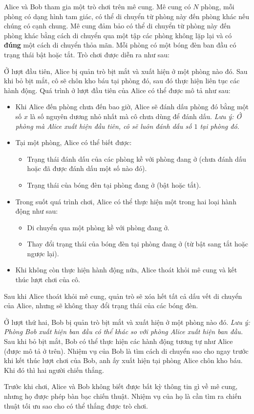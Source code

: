 Alice và Bob tham gia một trò chơi trên mê cung. Mê cung có $N$ phòng, mỗi phòng có dạng hình tam giác, có thể di chuyển từ phòng này đến phòng khác nếu chúng có cạnh chung. Mê cung đảm bảo có thể di chuyển từ phòng này đến phòng khác bằng cách di chuyển qua một tập các phòng không lặp lại và có \textbf{đúng} một cách di chuyển thỏa mãn. Mỗi phòng có một bóng đèn ban đầu có trạng thái bật hoặc tắt. Trò chơi được diễn ra như sau:

Ở lượt đầu tiên, Alice bị quản trò bịt mắt và xuất hiện ở một phòng nào đó. Sau khi bỏ bịt mắt, cô sẽ chôn kho báu tại phòng đó, sau đó thực hiện liên tục các hành động. Quá trình ở lượt đầu tiên của Alice có thể được mô tả như sau:
\begin{itemize}
   \item Khi Alice đến phòng chưa đến bao giờ, Alice sẽ đánh dấu phòng đó bằng một số $x$ là số nguyên dương nhỏ nhất mà cô chưa dùng để đánh dấu. \textit{Lưu ý: Ở phòng mà Alice xuất hiện đầu tiên, cô sẽ luôn đánh dấu số $1$ tại phòng đó}.
   \item Tại một phòng, Alice có thể biết được:
   \begin{itemize}
      \item Trạng thái đánh dấu của các phòng kề với phòng đang ở (chưa đánh dấu hoặc đã được đánh dấu một số nào đó).
      \item Trạng thái của bóng đèn tại phòng đang ở (bật hoặc tắt).
   \end{itemize}
   \item Trong suốt quá trình chơi, Alice có thể thực hiện một trong hai loại hành động như sau:
   \begin{itemize}
      \item Di chuyển qua một phòng kề với phòng đang ở.
      \item Thay đổi trạng thái của bóng đèn tại phòng đang ở (từ bật sang tắt hoặc ngược lại).
   \end{itemize}
   \item Khi không còn thực hiện hành động nữa, Alice thoát khỏi mê cung và kết thúc lượt chơi của cô.
\end{itemize}

Sau khi Alice thoát khỏi mê cung, quản trò sẽ xóa hết tất cả dấu vết di chuyển của Alice, nhưng sẽ không thay đổi trạng thái của các bóng đèn.

Ở lượt thứ hai, Bob bị quản trò bịt mắt và xuất hiện ở một phòng nào đó. \textit{Lưu ý: Phòng Bob xuất hiện ban đầu có thể khác so với phòng Alice xuất hiện ban đầu.} Sau khi bỏ bịt mắt, Bob có thể thực hiện các hành động tương tự như Alice (được mô tả ở trên). Nhiệm vụ của Bob là tìm cách di chuyển sao cho ngay trước khi kết thúc lượt chơi của Bob, anh ấy xuất hiện tại phòng Alice chôn kho báu. Khi đó thì hai người chiến thắng.

Trước khi chơi, Alice và Bob không biết được bất kỳ thông tin gì về mê cung, nhưng họ được phép bàn bạc chiến thuật. Nhiệm vụ của họ là cần tìm ra chiến thuật tối ưu sao cho có thể thắng được trò chơi.